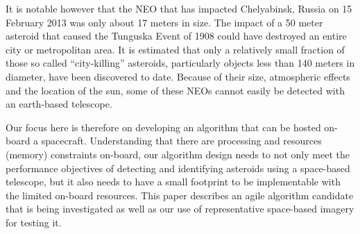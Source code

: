 \documentclass{article}
\begin{document}
It is notable however that the NEO that has impacted Chelyabinsk, Russia on 15 February 2013 was only about 17 meters in size.  The impact of a 50 meter asteroid that caused the Tunguska Event of 1908 could have destroyed an entire city or metropolitan area. It is estimated that only a relatively small fraction of those so called ``city-killing'' asteroids, particularly objects less than 140 meters in diameter, have been discovered to date. Because of their size, atmospheric effects and the location of the sun, some of these NEOs cannot easily be detected with an earth-based telescope.  

Our focus here is therefore on developing an algorithm that can be hosted on-board a spacecraft.  Understanding that there are processing and resources (memory) constraints on-board, our algorithm design needs to not only meet the performance objectives of detecting and identifying asteroids using a space-based telescope, but it also needs to have a small footprint to be implementable with the limited on-board resources.  This paper describes an agile algorithm candidate that is being investigated as well as our use of representative space-based imagery for testing it.

 

\end{document}
